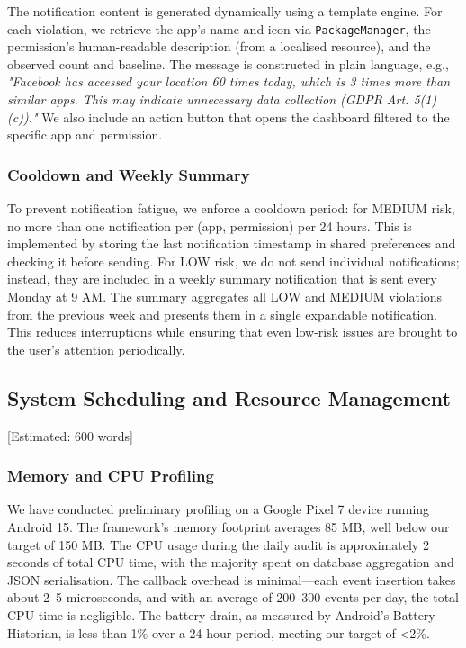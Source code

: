 The notification content is generated dynamically using a template engine. For each violation, we retrieve the app's name and icon via \texttt{PackageManager}, the permission's human-readable description (from a localised resource), and the observed count and baseline. The message is constructed in plain language, e.g., \textit{"Facebook has accessed your location 60 times today, which is 3 times more than similar apps. This may indicate unnecessary data collection (GDPR Art. 5(1)(c))."} We also include an action button that opens the dashboard filtered to the specific app and permission.

\subsubsection{Cooldown and Weekly Summary}

To prevent notification fatigue, we enforce a cooldown period: for MEDIUM risk, no more than one notification per (app, permission) per 24 hours. This is implemented by storing the last notification timestamp in shared preferences and checking it before sending. For LOW risk, we do not send individual notifications; instead, they are included in a weekly summary notification that is sent every Monday at 9 AM. The summary aggregates all LOW and MEDIUM violations from the previous week and presents them in a single expandable notification. This reduces interruptions while ensuring that even low-risk issues are brought to the user's attention periodically.

\subsection{System Scheduling and Resource Management} [Estimated: 600 words]

\subsubsection{Memory and CPU Profiling}

We have conducted preliminary profiling on a Google Pixel 7 device running Android 15. The framework's memory footprint averages 85 MB, well below our target of 150 MB. The CPU usage during the daily audit is approximately 2 seconds of total CPU time, with the majority spent on database aggregation and JSON serialisation. The callback overhead is minimal—each event insertion takes about 2–5 microseconds, and with an average of 200–300 events per day, the total CPU time is negligible. The battery drain, as measured by Android's Battery Historian, is less than 1\% over a 24-hour period, meeting our target of <2\%.

